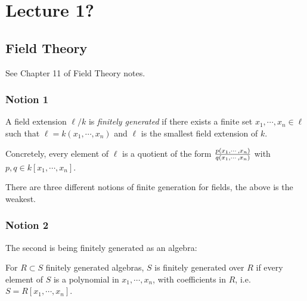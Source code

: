 \newpage

\tableofcontents
\newpage

\hypertarget{lecture-1}{%
\section{Lecture 1?}\label{lecture-1}}

\hypertarget{field-theory}{%
\subsection{Field Theory}\label{field-theory}}

See Chapter 11 of Field Theory notes.

\hypertarget{notion-1}{%
\subsubsection{Notion 1}\label{notion-1}}

\begin{definition}

A field extension \(\ell/k\) is \emph{finitely generated} if there
exists a finite set \(x_1, \cdots, x_n \in \ell\) such that
\(\ell = k(x_1, \cdots, x_n)\) and \(\ell\) is the smallest field
extension of \(k\).

Concretely, every element of \(\ell\) is a quotient of the form
\({p(x_1, \cdots, x_n) \over q(x_1, \cdots, x_n)}\) with
\(p, q\in k[x_1, \cdots, x_n]\).

\end{definition}

There are three different notions of finite generation for fields, the
above is the weakest.

\hypertarget{notion-2}{%
\subsubsection{Notion 2}\label{notion-2}}

The second is being finitely generated as an algebra:

\begin{definition}

For \(R\subset S\) finitely generated algebras, \(S\) is finitely
generated over \(R\) if every element of \(S\) is a polynomial in
\(x_1, \cdots, x_n\), with coefficients in \(R\),
i.e.~\(S = R[x_1, \cdots, x_n]\).

\end{definition}

